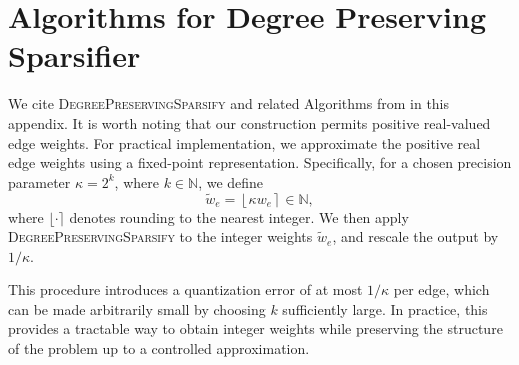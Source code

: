 \documentclass[lettersize,journal]{IEEEtran}
\begin{document}
{%

\section{Algorithms for Degree Preserving Sparsifier}
\label{apx:short-cycle-decomposition}
We cite \textsc{DegreePreservingSparsify} and related Algorithms from \cite{degree-preserving-sparsifier} in this appendix.
It is worth noting that our construction permits positive real-valued edge weights. For practical implementation, we approximate the positive real edge weights using a fixed-point representation. Specifically, for a chosen precision parameter $\kappa = 2^{k}$, where $k\in \mathbb{N}$, we define
\[
\tilde{w}_e = \left\lfloor \kappa w_e \right\rceil \in \mathbb{N},
\]
where $\lfloor \cdot \rceil$ denotes rounding to the nearest integer. We then apply \textsc{DegreePreservingSparsify} to the integer weights $\tilde{w}_e$, and rescale the output by $1/\kappa$. 

This procedure introduces a quantization error of at most $1/\kappa$ per edge, which can be made arbitrarily small by choosing $k$ sufficiently large. In practice, this provides a tractable way to obtain integer weights while preserving the structure of the problem up to a controlled approximation.

    
    
    
    

}
\end{document}
